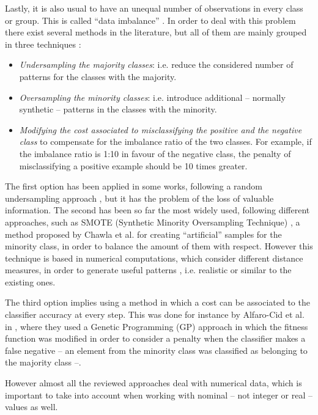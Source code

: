 Lastly, it is also usual to have an unequal number of observations in every class or group. This is called ``data imbalance'' \cite{imbalanced_data_05}. In order to deal with this problem there exist several methods in the literature, but all of them are mainly grouped in three techniques \cite{imbalance_techniques_02}: 

\begin{itemize}
\item \textit{Undersampling the majority classes}: i.e. reduce the considered number of patterns for the classes with the majority.
\item \textit{Oversampling the minority classes}: i.e. introduce additional -- normally synthetic -- patterns in the classes with the minority.
\item \textit{Modifying the cost associated to misclassifying the positive and the negative class} to compensate for the imbalance ratio of the two classes. For example, if the imbalance ratio is 1:10 in favour of the negative class, the penalty of misclassifying a positive example should be 10 times greater.
\end{itemize}

The first option has been applied in some works, following a random undersampling approach \cite{random_undersampling_08}, but it has the problem of the loss of valuable information. The second has been so far the most widely used, following different approaches, such as SMOTE (Synthetic Minority Oversampling Technique) \cite{smote_02}, a method proposed by Chawla et al. for creating ``artificial'' samples for the minority class, in order to balance the amount of them with respect. However this technique is based in numerical computations, which consider different distance measures, in order to generate useful patterns , i.e. realistic or similar to the existing ones.

The third option implies using a method in which a cost can be associated to the classifier accuracy at every step. This was done for instance by Alfaro-Cid et al. in \cite{cost_adjustment_07}, where they used a Genetic Programming (GP) approach in which the fitness function was modified in order to consider a penalty when the classifier makes a false negative -- an element from the minority class was classified as belonging to the majority class --.

However almost all the reviewed approaches deal with numerical data, which is important to take into account when working with nominal -- not integer or real -- values as well.

